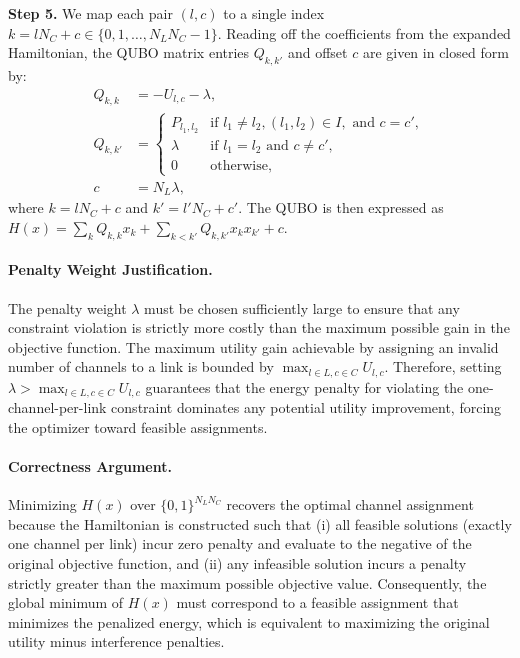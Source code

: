 \documentclass[12pt]{article}
\begin{document}
\textbf{Step 5.} We map each pair $(l,c)$ to a single index $k = l N_C + c \in \{0, 1, \dots, N_L N_C - 1\}$. Reading off the coefficients from the expanded Hamiltonian, the QUBO matrix entries $Q_{k,k'}$ and offset $c$ are given in closed form by:
\begin{align}
Q_{k,k} &= -U_{l,c} - \lambda, \\
Q_{k,k'} &= \begin{cases}
P_{l_1, l_2} & \text{if } l_1 \neq l_2, (l_1, l_2) \in I, \text{ and } c = c', \\
\lambda & \text{if } l_1 = l_2 \text{ and } c \neq c', \\
0 & \text{otherwise},
\end{cases} \\
c &= N_L \lambda,
\end{align}
where $k = l N_C + c$ and $k' = l' N_C + c'$. The QUBO is then expressed as $H(x) = \sum_{k} Q_{k,k} x_k + \sum_{k < k'} Q_{k,k'} x_k x_{k'} + c$.

\paragraph{Penalty Weight Justification.}
The penalty weight $\lambda$ must be chosen sufficiently large to ensure that any constraint violation is strictly more costly than the maximum possible gain in the objective function. The maximum utility gain achievable by assigning an invalid number of channels to a link is bounded by $\max_{l \in L, c \in C} U_{l,c}$. Therefore, setting $\lambda > \max_{l \in L, c \in C} U_{l,c}$ guarantees that the energy penalty for violating the one-channel-per-link constraint dominates any potential utility improvement, forcing the optimizer toward feasible assignments.

\paragraph{Correctness Argument.}
Minimizing $H(x)$ over $\{0,1\}^{N_L N_C}$ recovers the optimal channel assignment because the Hamiltonian is constructed such that (i) all feasible solutions (exactly one channel per link) incur zero penalty and evaluate to the negative of the original objective function, and (ii) any infeasible solution incurs a penalty strictly greater than the maximum possible objective value. Consequently, the global minimum of $H(x)$ must correspond to a feasible assignment that minimizes the penalized energy, which is equivalent to maximizing the original utility minus interference penalties.
\end{document}
